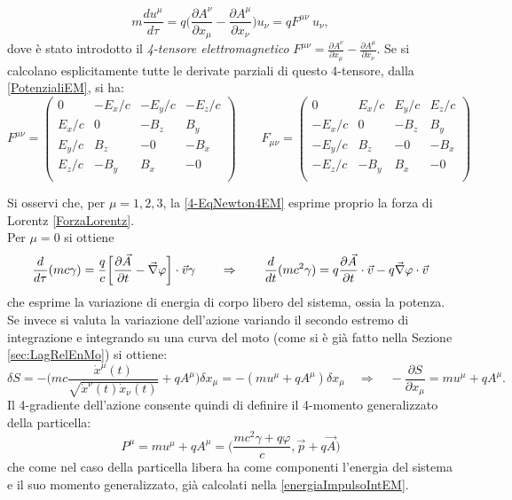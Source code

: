 \begin{equation}
    m\frac{du^\mu}{d\tau}=q\bigg(\frac{\partial A^\nu}{\partial x_\mu}-\frac{\partial A^\mu}{\partial x_\nu}\bigg)u_\nu=qF^{\mu\nu}\ u_\nu,\label{4-EqNewton4EM}
\end{equation}
dove è stato introdotto il \emph{4-tensore elettromagnetico} $F^{\mu\nu}=\frac{\partial A^\nu}{\partial x_\mu}-\frac{\partial A^\mu}{\partial x_\nu}$. Se si calcolano esplicitamente tutte le derivate parziali di questo 4-tensore, dalla \eqref{PotenzialiEM}, si ha:
\begin{equation}
    \label{4-tensoreEM}
    F^{\mu\nu}=
    \begin{pmatrix}
        0&-E_x/c&-E_y/c&-E_z/c\\
        E_x/c&0&-B_z&B_y\\
        E_y/c&B_z&-0&-B_x\\
        E_z/c&-B_y&B_x&-0\\
 \end{pmatrix}\qquad
 F_{\mu\nu}=
 \begin{pmatrix}
     0&E_x/c&E_y/c&E_z/c\\
     -E_x/c&0&-B_z&B_y\\
     -E_y/c&B_z&-0&-B_x\\
     -E_z/c&-B_y&B_x&-0\\
\end{pmatrix}
\end{equation}

Si osservi che, per $\mu=1,2,3$, la \eqref{4-EqNewton4EM} esprime proprio la forza di Lorentz \eqref{ForzaLorentz}.\\ Per $\mu=0$ si ottiene
\begin{equation}
    \frac{d}{d\tau}(mc\gamma)=\frac{q}{c}\bigg[\frac{\partial \vec A}{\partial t}-\vec{\nabla} \varphi\bigg]\cdot \vec v\gamma \qquad \Rightarrow \qquad \frac{d}{dt}(mc^2\gamma)=q\frac{\partial \vec A}{\partial t}\cdot \vec v - q\vec{\nabla} \varphi\cdot \vec v
\end{equation}
che esprime la variazione di energia di corpo libero del sistema, ossia la potenza.\\

Se invece si valuta la variazione dell'azione variando il secondo estremo di integrazione e integrando su una curva del moto (come si è già fatto nella Sezione \ref{sec:LagRelEnMo}) si ottiene:
\begin{equation*}
    \delta S=-\bigg(mc\frac{\dot x^\mu(t)}{\sqrt{\dot x^\nu(t)\dot x_\nu(t)}}+qA^\mu\bigg)\delta x_\mu=-(mu^\mu+qA^\mu)\delta x_\mu \quad \Rightarrow \quad -\frac{\partial S}{\partial x_\mu}=mu^\mu+qA^\mu.
\end{equation*}
Il 4-gradiente dell'azione consente quindi di definire il 4-momento generalizzato della particella:
\begin{equation}
    P^\mu=mu^\mu+qA^\mu=\bigg(\frac{mc^2\gamma+q\varphi}{c},\vec p+q\vec A\bigg)
\end{equation}
che come nel caso della particella libera ha come componenti l'energia del sistema e il suo momento generalizzato, già calcolati nella \eqref{energiaImpulsoIntEM}.

